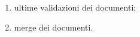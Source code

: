 \begin{enumerate}
    \item ultime validazioni dei documenti;
    \item merge dei documenti.
\end{enumerate}
